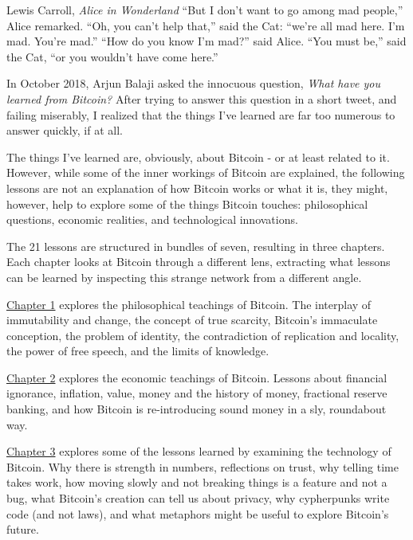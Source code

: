 \label{ch:introduction}

\begin{chapquote}{Lewis Carroll, \textit{Alice in Wonderland}}
``But I don’t want to go among mad people,'' Alice remarked. ``Oh, you can’t
help that,'' said the Cat: ``we’re all mad here. I’m mad. You’re mad.'' ``How do
you know I’m mad?'' said Alice. ``You must be,'' said the Cat, ``or you wouldn’t
have come here.''
\end{chapquote}

In October 2018, Arjun Balaji asked the innocuous question,
\textit{What have you learned from Bitcoin?} After trying to answer this
question in a short tweet, and failing miserably, I realized that the things
I've learned are far too numerous to answer quickly, if at all.

The things I've learned are, obviously, about Bitcoin - or at least related to
it. However, while some of the inner workings of Bitcoin are explained, the
following lessons are not an explanation of how Bitcoin works or what it is,
they might, however, help to explore some of the things Bitcoin touches:
philosophical questions, economic realities, and technological innovations.

The 21 lessons are structured in bundles of seven, resulting in three chapters.
Each chapter looks at Bitcoin through a different lens, extracting what
lessons can be learned by inspecting this strange network from a different
angle.

\hyperref[ch:philosophy]{Chapter 1} explores the philosophical teachings of
Bitcoin. The interplay of immutability and change, the concept of true scarcity,
Bitcoin's immaculate conception, the problem of identity, the contradiction of
replication and locality, the power of free speech, and the limits of knowledge.

\hyperref[ch:economics]{Chapter 2} explores the economic teachings of Bitcoin.
Lessons about financial ignorance, inflation, value, money and the history of
money, fractional reserve banking, and how Bitcoin is re-introducing sound money
in a sly, roundabout way.

\hyperref[ch:technology]{Chapter 3} explores some of the lessons learned by
examining the technology of Bitcoin.  Why there is strength in numbers,
reflections on trust, why telling time takes work, how moving slowly and not
breaking things is a feature and not a bug, what Bitcoin's creation can tell us
about privacy, why cypherpunks write code (and not laws), and what metaphors
might be useful to explore Bitcoin's future.


